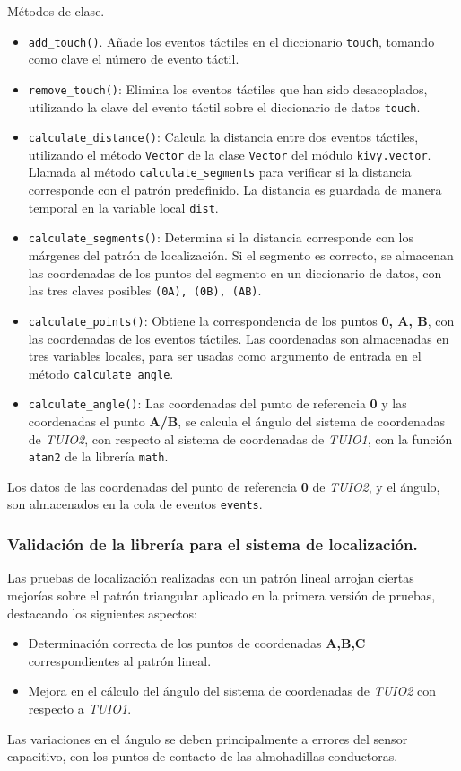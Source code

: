 Métodos de clase.
\begin{itemize}
\item \texttt{add\_touch()}. Añade los eventos táctiles en el diccionario \texttt{touch}, tomando como clave el número de evento táctil.

\item \texttt{remove\_touch()}: Elimina los eventos táctiles que han sido desacoplados, utilizando la clave del evento táctil sobre el diccionario de datos \texttt{touch}.

\item \texttt{calculate\_distance()}: Calcula la distancia entre dos eventos táctiles, utilizando el método \texttt{Vector} de la clase \texttt{Vector} del módulo \texttt{kivy.vector}. Llamada al método \texttt{calculate\_segments} para verificar si la distancia corresponde con el patrón predefinido. La distancia es guardada de manera temporal en la variable local \texttt{dist}.

\item \texttt{calculate\_segments()}: Determina si la distancia corresponde con los márgenes del patrón de localización. Si el segmento es correcto, se almacenan las coordenadas de los puntos del segmento en un diccionario de datos, con las tres claves posibles \texttt{(0A), (0B), (AB)}.

\item \texttt{calculate\_points()}: Obtiene la correspondencia de los puntos \textbf{0, A, B}, con las coordenadas de los eventos táctiles. Las coordenadas son almacenadas en tres variables locales, para ser usadas como argumento de entrada en el método \texttt{calculate\_angle}.

\item \texttt{calculate\_angle()}: Las coordenadas del punto de referencia \textbf{0} y las coordenadas el punto \textbf{A/B}, se calcula el ángulo del sistema de coordenadas de \emph{TUIO2}, con respecto al sistema de coordenadas de \emph{TUIO1}, con la función \texttt{atan2} de la librería \texttt{math}.
\end{itemize}
Los datos de las coordenadas del punto de referencia \textbf{0} de \emph{TUIO2}, y el ángulo, son almacenados en la cola de eventos \texttt{events}.

\subsubsection{Validación de la librería para el sistema de localización.}
Las pruebas de localización realizadas con un patrón lineal arrojan ciertas mejorías sobre el patrón triangular aplicado en la primera versión de pruebas, destacando los siguientes aspectos:
\begin{itemize}
\item Determinación correcta de los puntos de coordenadas \textbf{A,B,C} correspondientes al patrón lineal.
\item Mejora en el cálculo del ángulo del sistema de coordenadas de \emph{TUIO2} con respecto a \emph{TUIO1}. 
\end{itemize}
Las variaciones en el ángulo se deben principalmente a errores del sensor capacitivo, con los puntos de contacto de las almohadillas conductoras.

